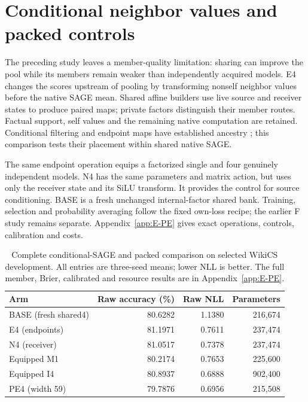 \section{Conditional neighbor values and packed controls}\label{sec:conditional-values}
The preceding study leaves a member-quality limitation: sharing can improve the pool while its members remain weaker than independently acquired models. E4 changes the scores upstream of pooling by transforming nonself neighbor values before the native SAGE mean. Shared affine builders use live source and receiver states to produce paired maps; private factors distinguish their member routes. Factual support, self values and the remaining native computation are retained. Conditional filtering and endpoint maps have established ancestry \citep{simonovsky2017ecc,brockschmidt2020film,bodnar2022sheaf,bourgerie2026deepnsd}; this comparison tests their placement within shared native SAGE.

The same endpoint operation equips a factorized single and four genuinely independent models. N4 has the same parameters and matrix action, but uses only the receiver state and its SiLU transform. It provides the control for source conditioning. BASE is a fresh unchanged internal-factor shared bank. Training, selection and probability averaging follow the fixed own-loss recipe; the earlier F study remains separate. Appendix~\ref{app:E-PE} gives exact operations, controls, calibration and costs.

\begin{table}[t]
\centering\small\setlength{\tabcolsep}{6pt}
\caption{Complete conditional-SAGE and packed comparison on selected WikiCS development. All entries are three-seed means; lower NLL is better. The full member, Brier, calibrated and resource results are in Appendix~\ref{app:E-PE}.}
\label{tab:E-PE-main}
\begin{tabular}{lrrr}
\toprule
Arm & Raw accuracy (\%) & Raw NLL & Parameters\\
\midrule
BASE (fresh shared4) & 80.6282 & 1.1380 & 216,674\\
E4 (endpoints) & 81.1971 & 0.7611 & 237,474\\
N4 (receiver) & 81.0517 & 0.7378 & 237,474\\
Equipped M1 & 80.2174 & 0.7653 & 225,600\\
Equipped I4 & 80.8937 & 0.6888 & 902,400\\
PE4 (width 59) & 79.7876 & 0.6956 & 215,508\\
\bottomrule\end{tabular}\end{table}

